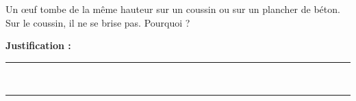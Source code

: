 Un œuf tombe de la même hauteur sur un coussin ou sur un plancher de béton. Sur le coussin, il ne se brise pas. Pourquoi ?

\choices

\noindent\textbf{Justification :} \hrulefill \\[2.5ex]
\rule{\linewidth}{0.4pt} \\[2.5ex]
\rule{\linewidth}{0.4pt}
\vfill
